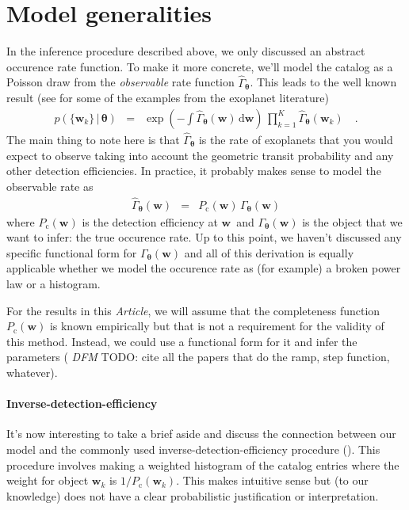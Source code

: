 \documentclass[12pt,preprint]{aastex}
\newcommand{\paper}{\emph{Article}}
\newcommand{\eqlabel}[1]{\label{eq:#1}}
\newcommand{\dd}{\ensuremath{\,\mathrm{d}}}
\newcommand{\bvec}[1]{\ensuremath{\boldsymbol{#1}}}
\newcommand{\todo}[3]{{\color{#2} \emph{#1} TODO: #3}}
\newcommand{\dfmtodo}[1]{\todo{DFM}{red}{#1}}
\newcommand{\rate}{\ensuremath{\Gamma}}
\newcommand{\ratepar}{{\ensuremath{\theta}}}
\newcommand{\ratepars}{{\ensuremath{\bvec{\ratepar}}}}
\newcommand{\obs}[1]{\ensuremath{\hat{#1}}}
\newcommand{\completeness}{{\ensuremath{P_\mathrm{c}}}}
\newcommand{\entry}{{\ensuremath{\bvec{w}}}}
\begin{document}
\section{Model generalities}

In the inference procedure described above, we only discussed an abstract
occurence rate function.
To make it more concrete, we'll model the catalog as a Poisson draw from the
\emph{observable} rate function $\obs{\rate}_\ratepars$.
This leads to the well known result (see \citealt{tabachnik,youdin} for some
of the examples from the exoplanet literature)
\begin{eqnarray}\eqlabel{poisson-like}
p(\{\entry_k\}\,|\,\ratepars) &=&
    \exp\left(-\int \obs{\rate}_\ratepars (\entry) \dd\entry\right) \,
    \prod_{k=1}^K \obs{\rate}_\ratepars (\entry_k)\quad.
\end{eqnarray}
The main thing to note here is that $\obs{\rate}_\ratepars$ is the rate of
exoplanets that you would expect to observe taking into account the geometric
transit probability and any other detection efficiencies.
In practice, it probably makes sense to model the observable rate as
\begin{eqnarray}
\obs{\rate}_\ratepars(\entry) &=&
    \completeness(\entry)\,\rate_\ratepars(\entry)
\end{eqnarray}
where $\completeness(\entry)$ is the detection efficiency at \entry\ and
$\rate_\ratepars(\entry)$ is the object that we want to infer: the true
occurence rate.
Up to this point, we haven't discussed any specific functional form for
$\rate_\ratepars(\entry)$ and all of this derivation is equally applicable
whether we model the occurence rate as (for example) a broken power law or
a histogram.

For the results in this \paper, we will assume that the completeness function
$\completeness(\entry)$ is known empirically but that is not a requirement for
the validity of this method.
Instead, we could use a functional form for it and infer the parameters
(\dfmtodo{cite all the papers that do the ramp, step function, whatever}).

\paragraph{Inverse-detection-efficiency}
It's now interesting to take a brief aside and discuss the connection between
our model and the commonly used inverse-detection-efficiency procedure
(\citealt{howard,dressing,petigura}).
This procedure involves making a weighted histogram of the catalog entries
where the weight for object $\entry_k$ is $1/\completeness(\entry_k)$.
This makes intuitive sense but (to our knowledge) does not have a clear
probabilistic justification or interpretation.
\end{document}
